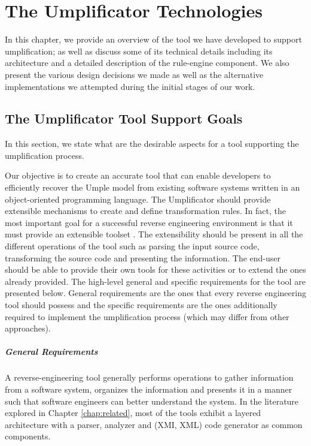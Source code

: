 \lhead{\emph{\leftmark}}  
\chapter{The Umplificator Technologies}
\label{chap:technology}
In this chapter, we provide an overview of the tool we have developed to support umplification; as well as discuss some of its technical details including its architecture and a detailed description of the rule-engine component. We also present the various design decisions we made as well as the alternative implementations we attempted during the initial stages of our work. 

\section{The Umplificator Tool Support Goals}
\label{sec:ch5Goals}
In this section, we state what are the desirable aspects for a tool supporting the umplification process. 

Our objective is to create an accurate tool that can enable developers to efficiently recover the Umple model from existing software systems written in an object-oriented programming language. The Umplificator should provide extensible mechanisms to create and define transformation rules. In fact, the most important goal for a successful reverse engineering environment is that it must provide an extensible toolset \cite{tilley1994programmable}. The extensibility should be present in all the different operations of the tool such as parsing the input source code, transforming the source code and presenting the information. The end-user should be able to provide their own tools for these activities or to extend the ones already provided.  The high-level general and specific requirements for the tool are presented below. General requirements are the ones that every reverse engineering tool should possess and the specific requirements are the ones additionally required to implement the umplification process (which may differ from other approaches).

\paragraph*{General Requirements}
A reverse-engineering tool generally performs operations to gather information from a software system, organizes the information and presents it in a manner such that software engineers can better understand the system. In the literature explored in Chapter \ref{chap:related}, most of the tools exhibit a layered architecture with a parser, analyzer and (XMI, XML) code generator as common components.

